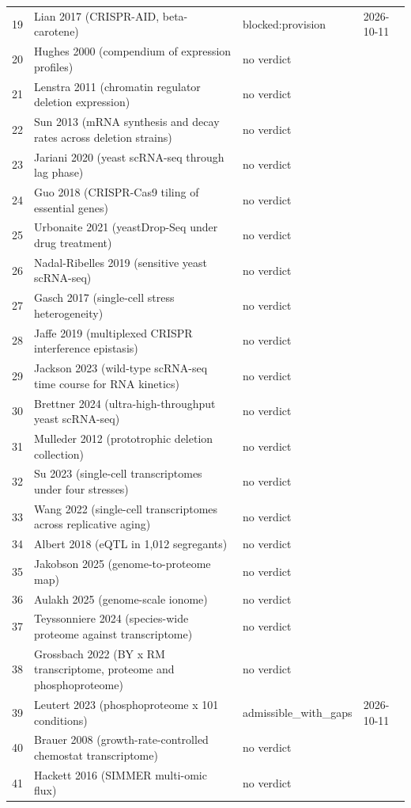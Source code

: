 \begin{longtable}{@{}r L{88mm} L{40mm} L{24mm}@{}}
19 & Lian 2017 (CRISPR-AID, beta-carotene) & blocked:provision & 2026-10-11 \\
20 & Hughes 2000 (compendium of expression profiles) & no verdict &  \\
21 & Lenstra 2011 (chromatin regulator deletion expression) & no verdict &  \\
22 & Sun 2013 (mRNA synthesis and decay rates across deletion strains) & no verdict &  \\
23 & Jariani 2020 (yeast scRNA-seq through lag phase) & no verdict &  \\
24 & Guo 2018 (CRISPR-Cas9 tiling of essential genes) & no verdict &  \\
25 & Urbonaite 2021 (yeastDrop-Seq under drug treatment) & no verdict &  \\
26 & Nadal-Ribelles 2019 (sensitive yeast scRNA-seq) & no verdict &  \\
27 & Gasch 2017 (single-cell stress heterogeneity) & no verdict &  \\
28 & Jaffe 2019 (multiplexed CRISPR interference epistasis) & no verdict &  \\
29 & Jackson 2023 (wild-type scRNA-seq time course for RNA kinetics) & no verdict &  \\
30 & Brettner 2024 (ultra-high-throughput yeast scRNA-seq) & no verdict &  \\
31 & Mulleder 2012 (prototrophic deletion collection) & no verdict &  \\
32 & Su 2023 (single-cell transcriptomes under four stresses) & no verdict &  \\
33 & Wang 2022 (single-cell transcriptomes across replicative aging) & no verdict &  \\
34 & Albert 2018 (eQTL in 1,012 segregants) & no verdict &  \\
35 & Jakobson 2025 (genome-to-proteome map) & no verdict &  \\
36 & Aulakh 2025 (genome-scale ionome) & no verdict &  \\
37 & Teyssonniere 2024 (species-wide proteome against transcriptome) & no verdict &  \\
38 & Grossbach 2022 (BY x RM transcriptome, proteome and phosphoproteome) & no verdict &  \\
39 & Leutert 2023 (phosphoproteome x 101 conditions) & admissible\_with\_gaps & 2026-10-11 \\
40 & Brauer 2008 (growth-rate-controlled chemostat transcriptome) & no verdict &  \\
41 & Hackett 2016 (SIMMER multi-omic flux) & no verdict &  \\

\end{longtable}
